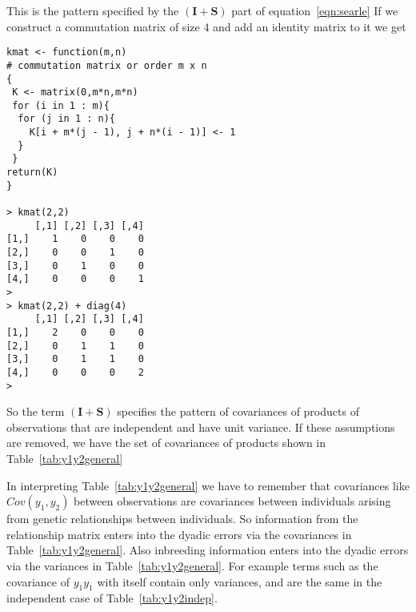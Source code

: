 \documentclass[titlepage]{article}  %
\begin{document}
This is the pattern specified by the $(\bm{I} + \bm{S})$ part of equation~\ref{eqn:searle} If we construct a commutation matrix of size $4$ and add an identity matrix to it we get
\begin{verbatim}
kmat <- function(m,n)
# commutation matrix or order m x n
{
 K <- matrix(0,m*n,m*n)
 for (i in 1 : m){
  for (j in 1 : n){
    K[i + m*(j - 1), j + n*(i - 1)] <- 1
  }
 }
return(K)
}

> kmat(2,2)
     [,1] [,2] [,3] [,4]
[1,]    1    0    0    0
[2,]    0    0    1    0
[3,]    0    1    0    0
[4,]    0    0    0    1
> 
> kmat(2,2) + diag(4)
     [,1] [,2] [,3] [,4]
[1,]    2    0    0    0
[2,]    0    1    1    0
[3,]    0    1    1    0
[4,]    0    0    0    2
> 
\end{verbatim}

So the term $(\bm{I} + \bm{S})$ specifies the pattern of covariances of products of observations that are independent and have unit variance. If these assumptions are removed, we have the set of covariances of products shown in Table~\ref{tab:y1y2general}

In interpreting Table~\ref{tab:y1y2general} we have to remember that covariances  like $Cov(y_{1},y_{2})$ between observations are covariances between individuals arising from genetic relationships between individuals. So information from the relationship matrix enters into the dyadic errors via the covariances in Table~\ref{tab:y1y2general}. Also inbreeding information enters into the dyadic errors via the variances in Table~\ref{tab:y1y2general}. For example terms such as the covariance of $y_{1}y_{1}$ with itself contain only variances, and are the same in the independent case of Table~\ref{tab:y1y2indep}.
\end{document}
